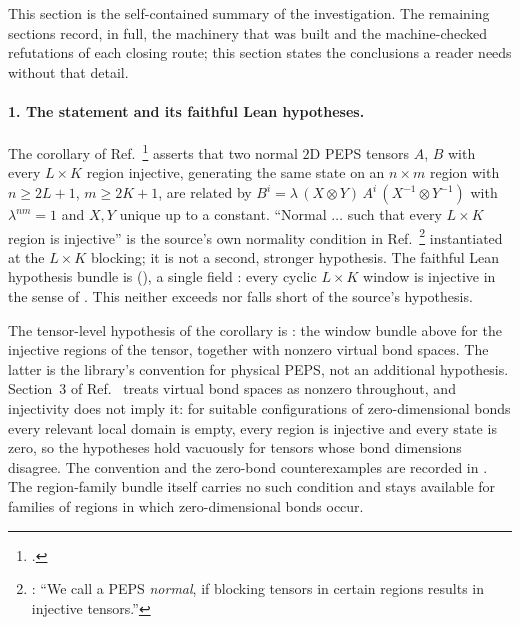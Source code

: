 \documentclass{article}
\begin{document}
This section is the self-contained summary of the investigation. The
remaining sections record, in full, the machinery that was built and the
machine-checked refutations of each closing route; this section states the
conclusions a reader needs without that detail.

\paragraph{1. The statement and its faithful Lean hypotheses.}
The corollary of Ref.~\cite{Molnar2018NormalPEPS}\footnote{.}
asserts that two normal $2$D PEPS tensors $A$, $B$ with every $L \times K$
region injective, generating the same state on an $n \times m$ region with
$n \geq 2L+1$, $m \geq 2K+1$, are related by
$B^i = \lambda\,(X \otimes Y)\,A^i\,(X^{-1} \otimes Y^{-1})$ with
$\lambda^{nm} = 1$ and $X, Y$ unique up to a constant. ``Normal $\dots$ such
that every $L \times K$ region is injective'' is the source's own normality
condition in Ref.~\cite{Molnar2018NormalPEPS}\footnote{: ``We call
    a PEPS \emph{normal}, if blocking tensors in certain regions results in
    injective tensors.''} instantiated at the $L \times K$ blocking; it is not a
second, stronger hypothesis. The faithful Lean hypothesis bundle is
(), a single field
: every cyclic $L \times K$ window is injective in
the sense of . This neither
exceeds nor falls short of the source's hypothesis.

The tensor-level hypothesis of the corollary is
: the window bundle above for
the injective regions of the tensor, together with nonzero virtual bond
spaces. The latter is the library's convention for physical PEPS, not an
additional hypothesis. Section~3 of Ref.~\cite{Molnar2018NormalPEPS} treats
virtual bond spaces as nonzero throughout, and injectivity does not imply it:
for suitable configurations of zero-dimensional bonds every relevant local
domain is empty, every region is injective and every state is zero, so the
hypotheses hold vacuously for tensors whose bond dimensions
disagree. The convention and the zero-bond counterexamples are recorded in
. The region-family
bundle itself carries no such condition and stays available for families of
regions in which zero-dimensional bonds occur.
\end{document}
